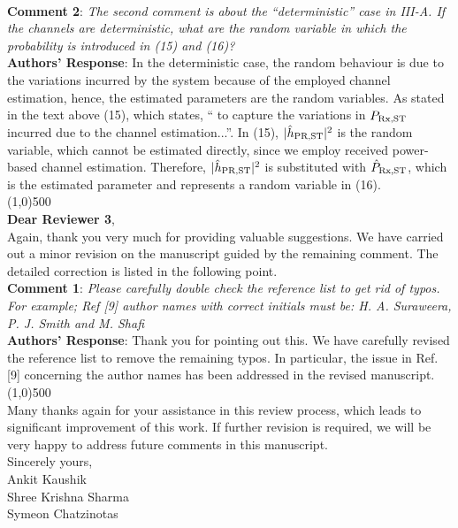 \documentclass[12pt,a4wide,peerreview]{IEEEtran}
\newcommand{\tc}[1]{#1}
\begin{document}
\\
\textbf{\tc{Comment 2}}: 
\textit{
The second comment is about the ``deterministic'' case in III-A. If the channels are deterministic, what are the random variable in which the probability is introduced in (15) and (16)? 
}
\\
\textbf{Authors' Response}:
In the deterministic case, the random behaviour is due to the variations incurred by the system because of the employed channel estimation, hence, the estimated parameters are the random variables. As stated in the text above (15), which states, `` to capture the variations in $P_{\text{Rx,ST}}$ incurred due to the channel estimation...''. In (15), $|\hat{h}_{\text{PR,ST}}|^2$ is the random variable, which cannot be estimated directly, since we employ received power-based channel estimation. Therefore, $|\hat{h}_{\text{PR,ST}}|^2$ is substituted with $\hat{P}_{\text{Rx,ST}}$, which is the estimated parameter and represents a random variable in (16). \\
\line(1,0){500} \\
\textbf{Dear Reviewer 3},\\
Again, thank you very much for providing valuable suggestions. We have carried out a minor revision on the manuscript guided by the remaining comment. The detailed correction is listed in the following point. \\
\textbf{{Comment 1}}: 
\textit{
Please carefully double check the reference list to get rid of typos. For example; Ref [9] author names with correct initials must be:  H. A. Suraweera, P. J. Smith and M. Shafi
}
\\
\textbf{Authors' Response}:
Thank you for pointing out this. We have carefully revised the reference list to remove the remaining typos. In particular, the issue in Ref. [9] concerning the author names has been addressed in the revised manuscript. 
\\
\line(1,0){500} \\
Many thanks again for your assistance in this review process, which leads to significant improvement of this work. If further revision is required, we will be very happy to address future comments in this manuscript. \\
Sincerely yours,\\
\hspace{5 pt} Ankit Kaushik\\
\hspace{5 pt} Shree Krishna Sharma\\
\hspace{5 pt} Symeon Chatzinotas\\
\end{document}
